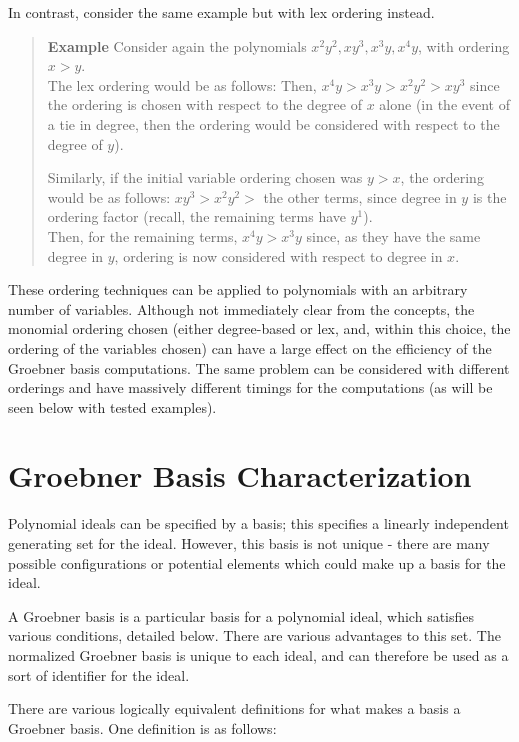 \documentclass[letterpaper,12pt,titlepage,oneside,final]{book}
\newcounter{examplecounter}
\newenvironment{example}{\begin{quote}%
    \refstepcounter{examplecounter}%
  \textbf{Example \arabic{examplecounter}}%
  \quad
}{%
\end{quote}%
}
\begin{document}
In contrast, consider the same example but with lex ordering instead.
\begin{example}\label{ex: Multivariate lex ordering}
  Consider again the polynomials ${x^2y^2, xy^3, x^3y, x^4y}$, with ordering ${x > y}$.\\
  The lex ordering would be as follows:
  Then, ${x^4y > x^3y > x^2y^2 > xy^3}$ since the ordering is chosen with respect to the degree of ${x}$ alone (in the event of a tie in degree, then the ordering would be considered with respect to the degree of ${y}$).

  Similarly, if the initial variable ordering chosen was ${y > x}$, the ordering would be as follows:
  ${xy^3 > x^2y^2 >}$ the other terms, since degree in ${y}$ is the ordering factor (recall, the remaining terms have ${y^1}$).\\
  Then, for the remaining terms, ${x^4y > x^3y}$ since, as they have the same degree in ${y}$, ordering is now considered with respect to degree in ${x}$.
\end{example}

These ordering techniques can be applied to polynomials with an arbitrary number of variables.  Although not immediately clear from the concepts, the monomial ordering chosen (either degree-based or lex, and, within this choice, the ordering of the variables chosen) can have a large effect on the efficiency of the Groebner basis computations.  The same problem can be considered with different orderings and have massively different timings for the computations (as will be seen below with tested examples).


\section{Groebner Basis Characterization}

Polynomial ideals can be specified by a basis; this specifies a linearly independent generating set for the ideal.  However, this basis is not unique - there are many possible configurations or potential elements which could make up a basis for the ideal.  

A Groebner basis is a particular basis for a polynomial ideal, which satisfies various conditions, detailed below.  There are various advantages to this set.  The normalized Groebner basis is unique to each ideal, and can therefore be used as a sort of identifier for the ideal. 

There are various logically equivalent definitions for what makes a basis a Groebner basis.  One definition is as follows: 
\end{document}
